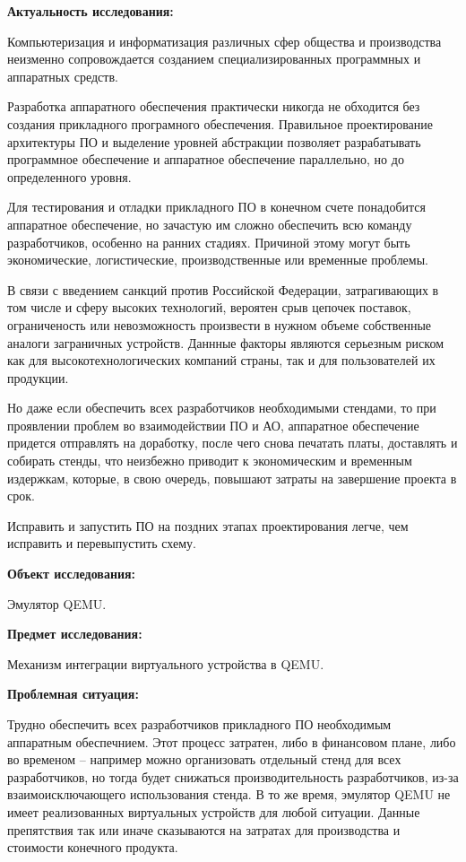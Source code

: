 \textbf{Актуальность исследования:}

Компьютеризация и информатизация различных сфер общества и производства неизменно
сопровождается созданием специализированных программных и аппаратных средств.

Разработка аппаратного обеспечения практически никогда не обходится без создания
прикладного програмного обеспечения.
Правильное проектирование архитектуры ПО и выделение уровней абстракции позволяет
разрабатывать программное обеспечение и аппаратное обеспечение параллельно, но
до определенного уровня.

Для тестирования и отладки прикладного ПО в конечном счете понадобится аппаратное обеспечение,
но зачастую им сложно обеспечить всю команду разработчиков, особенно на ранних стадиях.
Причиной этому могут быть экономические, логистические, производственные или временные проблемы.

В связи с введением санкций против Российской Федерации, затрагивающих
в том числе и сферу высоких технологий, вероятен срыв цепочек поставок,
ограниченость или невозможность произвести в нужном объеме собственные
аналоги заграничных устройств.
Даннные факторы являются серьезным риском как для высокотехнологических
компаний страны, так и для пользователей их продукции.

Но даже если обеспечить всех разработчиков необходимыми стендами, то при проявлении
проблем во взаимодействии ПО и АО, аппаратное обеспечение придется отправлять на доработку,
после чего снова печатать платы, доставлять и собирать стенды, что неизбежно приводит к экономическим
и временным издержкам, которые, в свою очередь, повышают затраты на завершение проекта в срок.

Исправить и запустить ПО на поздних этапах проектирования легче, чем исправить и перевыпустить схему.

\textbf{Объект исследования:}

Эмулятор QEMU.

\textbf{Предмет исследования:}

Механизм интеграции виртуального устройства в QEMU.

\textbf{Проблемная ситуация:}

Трудно обеспечить всех разработчиков прикладного ПО необходимым
аппаратным обеспечнием. Этот процесс затратен, либо в финансовом плане,
либо во временом -- например можно организовать отдельный стенд для
всех разработчиков, но тогда будет снижаться производительность
разработчиков, из-за взаимоисключающего использования стенда.
В то же время, эмулятор QEMU не имеет реализованных виртуальных
устройств для любой ситуации. Данные препятствия так или иначе
сказываются на затратах для производства и стоимости конечного продукта.

